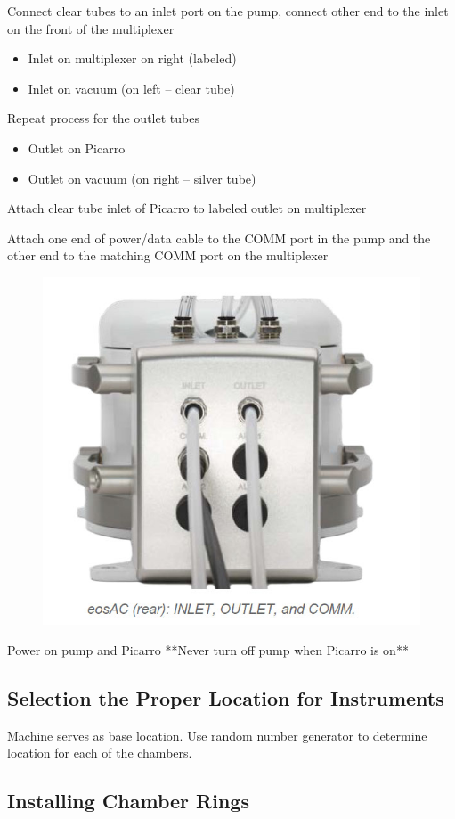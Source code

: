 \documentclass[12pt]{../SOP3}\usepackage[]{graphicx}\usepackage[]{color}
\begin{document}
\NP Connect clear tubes to an inlet port on the pump, connect other end to the inlet on the front of the multiplexer

\begin{itemize}
  \item Inlet on multiplexer on right (labeled)
  \item Inlet on vacuum (on left -- clear tube)
\end{itemize}



\NP Repeat process for the outlet tubes
\begin{itemize}
  \item Outlet on Picarro
  \item Outlet on vacuum (on right -- silver tube)
\end{itemize}

\NP Attach clear tube inlet of Picarro to labeled outlet on multiplexer

\NP Attach one end of power/data cable to the COMM port in the pump and the other end to the matching COMM port on the multiplexer

\begin{figure}
  \includegraphics[width=.5\textwidth]{"graphics/COMM"}
\end{figure}

\NP Power on pump and Picarro **Never turn off pump when Picarro is on**

\subsection*{Selection the Proper Location for Instruments}

\NP Machine serves as base location.
\NP Use random number generator to determine location for each of the chambers.

\subsection*{Installing Chamber Rings}
\end{document}
